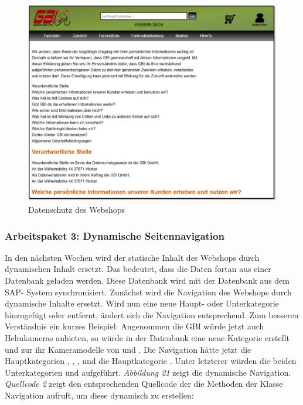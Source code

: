 \begin{figure}[H]
\begin{center}
\includegraphics[width=150mm]{Bilder/Abbildung8-DatenschutzDesWebshops.png}
\end{center}
\caption{Datenschutz des Webshops}
\end{figure}

\subsubsection{Arbeitspaket 3: Dynamische Seitennavigation}

In den nächsten Wochen wird der statische Inhalt des Webshops durch dynamischen Inhalt ersetzt. Das bedeutet, dass die Daten fortan aus einer Datenbank geladen werden. Diese Datenbank wird mit der Datenbank aus dem SAP- System synchronisiert. Zunächst wird die Navigation des Webshops durch dynamische Inhalte ersetzt. Wird nun eine neue Haupt- oder Unterkategorie hinzugefügt oder entfernt, ändert sich die Navigation entsprechend. Zum besseren Verständnis ein kurzes Beispiel: Angenommen die GBI würde jetzt auch Helmkameras anbieten, so würde in der Datenbank eine neue Kategorie \grqq{} erstellt und zur ihr Kameramodelle von \grqq{} und \grqq{}. Die Navigation hätte jetzt die Hauptkategorien \grqq{}, \grqq{}, \grqq{}, \grqq{} und die Hauptkategorie \grqq{}. Unter letzterer würden die beiden Unterkategorien \grqq{} und \grqq{} aufgeführt. \textit{Abbildung 21} zeigt die dynamische Navigation.
\textit{Quellcode 2} zeigt den entsprechenden Quellcode der die Methoden der Klasse Navigation aufruft, um diese dynamisch zu erstellen:

